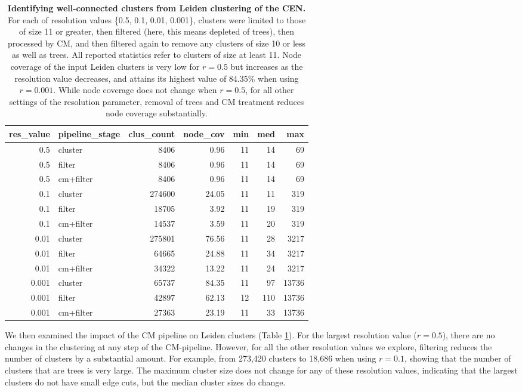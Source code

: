 \documentclass[11pt]{article}   	%
\begin{document}
\begin{table}[ht]
\centering
\begin{tabular}{rlrrrrr}
  \hline
res\_value & pipeline\_stage & clus\_count & node\_cov & min & med & max \\
  \hline
0.5 & cluster &  8406 & 0.96 &    11 & 14 &    69 \\
  0.5 & filter &  8406 & 0.96 &    11 & 14 &    69 \\
  0.5 & cm+filter &  8406 & 0.96 &    11 & 14 &    69 \\
  \hline
  0.1 & cluster & 274600 & 24.05 &    11 & 11 &   319 \\
  0.1 & filter & 18705 & 3.92 &    11 & 19 &   319 \\
  0.1 & cm+filter & 14537 & 3.59 &    11 & 20 &   319 \\
  \hline
  0.01 & cluster & 275801 & 76.56 &    11 & 28 &  3217 \\
  0.01 & filter & 64665 & 24.88 &    11 & 34 &  3217 \\
  0.01 & cm+filter & 34322 & 13.22 &    11 & 24 &  3217 \\
  \hline
  0.001 & cluster & 65737 & 84.35 &    11 & 97 & 13736 \\
  0.001 & filter & 42897 & 62.13 &    12 & 110 & 13736 \\
  0.001 & cm+filter & 27363 & 23.19 &    11 & 33 & 13736 \\
   \hline
\end{tabular}
\caption{\textbf{Identifying well-connected clusters from Leiden clustering of the CEN.} For each of resolution values \{0.5, 0.1, 0.01, 0.001\}, clusters were limited to those of size 11 or greater, then filtered (here, this means depleted of trees), then processed by CM, and then filtered again to remove any clusters of size 10 or less as well as trees. All reported statistics  refer to clusters of size at least 11.
Node coverage of the input Leiden clusters is very low for $r=0.5$ but increases as the resolution value decreases, and attains its highest value of 84.35\% when using $r=0.001$.
While node coverage does not change when $r=0.5$, for all other settings of the resolution parameter, removal of trees and CM treatment reduces node coverage substantially.}
\label{tab:CEN-Leiden-11-CM}
\end{table}

We then examined the impact of the CM pipeline on Leiden clusters (Table \ref{tab:CEN-Leiden-11-CM}).  For the largest resolution value ($r=0.5$), there are no changes in the clustering at any step of the CM-pipeline.
However, for all the other resolution values we explore, filtering reduces the number of clusters by a substantial amount. For example, from 273,420 clusters to 18,686 when using $r=0.1$, showing that the number of clusters
that are trees is very large. The maximum cluster size does not change for any of these resolution values, indicating that the largest clusters do not have small edge cuts,  but the median cluster sizes do change.
\end{document}
